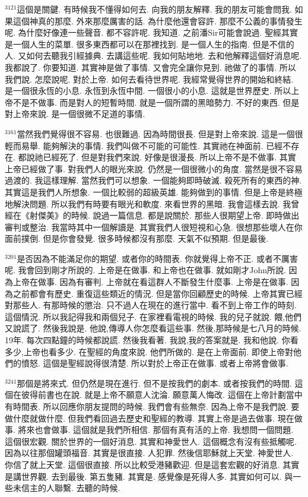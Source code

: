 \documentclass{book}
\begin{document}
$^{3121}$這個是關鍵.
有時候我不懂得如何去.
向我的朋友解釋.
我的朋友可能會問我.
如果這個神真的那麼.
外來那麼厲害的話.
為什麼他還會容許.
那麼不公義的事情發生呢.
為什麼好像連一些聲音.
都不容許呢.
我知道.
之前潘Sir可能會說過.
聖經其實是一個人生的菜單.
很多東西都可以在那裡找到.
是一個人生的指南.
但是不信的人.
又如何去聽我引經據典.
去講這些呢.
我如何貼地地.
去和他解釋這個好消息呢.
我都說了.
你要知道.
其實神是做了事情.
又會完全讓你見到.
祂做了的事情.
所以我們說.
怎麼說呢.
對於上帝.
如何去看待世界呢.
我經常覺得世界的開始和終結.
是一個很永恆的小息.
永恆到永恆中間.
一個很小的小息.
這就是世界歷史.
所以上帝不是不做事.
而是對人的短暫時間.
就是一個所謂的黑暗勢力.
不好的東西.
但是對上帝來說.
是一個很微不足道的事情.

$^{3161}$當然我們覺得很不容易.
也很難過.
因為時間很長.
但是對上帝來說.
這是一個很輕而易舉.
能夠解決的事情.
我們叫做不可能的可能性.
其實祂在神面前.
已經不存在.
都說祂已經死了.
但是對我們來說.
好像是很漫長.
所以上帝不是不做事.
其實上帝已經做了事.
對我們人的眼光來說.
仍然是一個很微小的角度.
當然是很不容易過渡的.
我這樣理解.
當然我們可以想象.
一個能夠即時破滅.
殺死所有的東西的神.
其實這是我們人所想象.
一個比較弱的超級英雄.
能夠做到的事情.
但是上帝是終極地解決問題.
所以我們有時要有眼光和軟度.
來看世界的黑暗.
我會這樣去說.
我曾經在《射傑美》的時候.
說過一篇信息.
都是說關於.
那些人很期望上帝.
即時做出審判或整治.
我當時其中一個解讀是.
其實我們人很短視和心急.
很想那些壞人在你面前撲倒.
但是你會發覺.
很多時候都沒有那麼.
天氣不似預期.
但是最後.

$^{3201}$是否因為不能滿足你的期望.
或者你的時間表.
你就覺得上帝不正.
或者不厲害呢.
我會回到剛才所說的.
上帝是在做事.
和上帝也在做事.
就如剛才John所說.
因為上帝在做事.
因為有審判.
上帝就在看這群人不斷發生什麼事.
上帝是在做事.
因為之前都會有歷史.
重復這些類近的情況.
但是當你回顧歷史的時候.
上帝其實已經對那些人.
有那時候的懲治.
只不過人在現在的進行當中.
看不到上帝工作的時刻.
這個情況.
所以我記得我和兩個兒子.
在家裡看電視的時候.
我的兒子就說.
餵,他們又說謊了.
然後我說是.
他說,傳導人你怎麼看這些事.
然後,那時候是七八月的時候.
19年.
每次四點鐘的時候都說謊.
然後我看著.
我說,我的答案就是.
我和他說.
你看多少,上帝也看多少.
在聖經的角度來說.
他們所做的.
是在上帝面前.
即使上帝對他們的憤怒.
這個是聖經說得很清楚.
所以對於上帝正在做事.
或者上帝將會做事.

$^{3241}$那個是將來式.
但仍然是現在進行.
但不是按我們的劇本.
或者按我們的時間.
這個在彼得前書也在說.
就是上帝不願意人沈淪.
願意萬人悔改.
這個在上帝計劃當中有時間表.
所以回應你朋友提問的時候.
我們會有些無奈.
因為上帝不是我們說.
要做什麼就做什麼.
但我們看回過去歷史和聖經的教導.
其實上帝是過去做事.
現在做事.
將來也會做事.
這個就是我們所相信.
那個有真有活的上帝.
我想問一個問題.
這個很宏觀.
關於世界的一個好消息.
其實和神愛世人.
這個概念有沒有些抵觸呢.
因為以往那個罐頭福音.
其實是很直接.
人犯罪.
然後信耶穌就上天堂.
神愛世人.
你信了就上天堂.
這個很直接.
所以比較受港豬歡迎.
但是這套宏觀的好消息.
其實是講世界觀.
去到最後.
第五隻豬.
其實是.
感覺像是死得人多.
其實如何可以.
與一些未信主的人聯繫.
去聽的時候.
\end{document}
